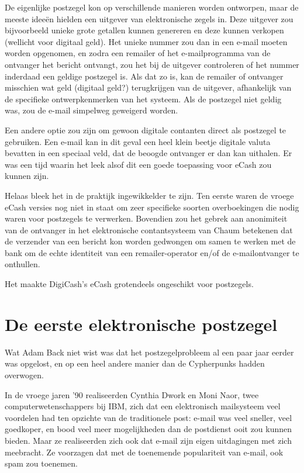 \documentclass[
  a5paper,
  smalldemyvopaper,11pt,twoside,onecolumn,openright,extrafontsizes]{memoir}
\begin{document}
De eigenlijke postzegel kon op verschillende manieren worden ontworpen,
maar de meeste ideeën hielden een uitgever van elektronische zegels in.
Deze uitgever zou bijvoorbeeld unieke grote getallen kunnen genereren en
deze kunnen verkopen (wellicht voor digitaal geld). Het unieke nummer
zou dan in een e-mail moeten worden opgenomen, en zodra een remailer of
het e-mailprogramma van de ontvanger het bericht ontvangt, zou het bij
de uitgever controleren of het nummer inderdaad een geldige postzegel
is. Als dat zo is, kan de remailer of ontvanger misschien wat geld
(digitaal geld?) terugkrijgen van de uitgever, afhankelijk van de
specifieke ontwerpkenmerken van het systeem. Als de postzegel niet
geldig was, zou de e-mail simpelweg geweigerd worden.

Een andere optie zou zijn om gewoon digitale contanten direct als
postzegel te gebruiken. Een e-mail kan in dit geval een heel klein
beetje digitale valuta bevatten in een speciaal veld, dat de beoogde
ontvanger er dan kan uithalen. Er was een tijd waarin het leek alsof dit
een goede toepassing voor eCash zou kunnen zijn.

Helaas bleek het in de praktijk ingewikkelder te zijn. Ten eerste waren
de vroege eCash versies nog niet in staat om zeer specifieke soorten
overboekingen die nodig waren voor postzegels te verwerken. Bovendien
zou het gebrek aan anonimiteit van de ontvanger in het elektronische
contantsysteem van Chaum betekenen dat de verzender van een bericht kon
worden gedwongen om samen te werken met de bank om de echte identiteit
van een remailer-operator en/of de e-mailontvanger te onthullen.

Het maakte DigiCash's eCash grotendeels ongeschikt voor postzegels.

\section{De eerste elektronische
postzegel}\label{de-eerste-elektronische-postzegel}

Wat Adam Back niet wist was dat het postzegelprobleem al een paar jaar
eerder was opgelost, en op een heel andere manier dan de Cypherpunks
hadden overwogen.

In de vroege jaren '90 realiseerden Cynthia Dwork en Moni Naor, twee
computerwetenschappers bij IBM, zich dat een elektronisch mailsysteem
veel voordelen had ten opzichte van de traditionele post: e-mail was
veel sneller, veel goedkoper, en bood veel meer mogelijkheden dan de
postdienst ooit zou kunnen bieden. Maar ze realiseerden zich ook dat
e-mail zijn eigen uitdagingen met zich meebracht. Ze voorzagen dat met
de toenemende populariteit van e-mail, ook spam zou toenemen.
\end{document}

